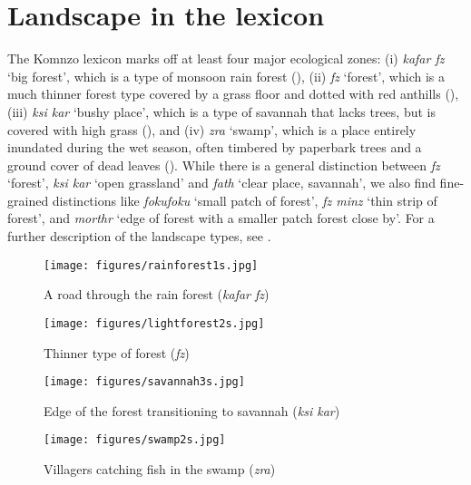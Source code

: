 \section{Landscape in the lexicon}\label{sec:landscapelex}
The Komnzo lexicon marks off at least four major ecological zones: (i) \textit{kafar fz} `big forest’, which is a type of monsoon rain forest (), (ii) \textit{fz} `forest’, which is a much thinner forest type covered by a grass floor and dotted with red anthills (), (iii) \textit{ksi kar} `bushy place’, which is a type of savannah that lacks trees, but is covered with high grass (), and (iv) \textit{zra} `swamp’, which is a place entirely inundated during the wet season, often timbered by paperbark trees and a ground cover of dead leaves (). While there is a general distinction between \textit{fz} `forest’, \textit{ksi kar} `open grassland’ and \textit{fath} `clear place, savannah’, we also find fine-grained distinctions like \textit{fokufoku} `small patch of forest’, \textit{fz minz} `thin strip of forest’, and \textit{morthr} `edge of forest with a smaller patch forest close by’. For a further description of the landscape types, see \citet[10ff.]{Dohler:2018qt}.

\begin{figure}
    \texttt{[image: figures/rainforest1s.jpg]}
    \caption{A road through the rain forest (\textit{kafar fz})}
    \label{fig:kafarfz}
\end{figure}
\begin{figure}
    \texttt{[image: figures/lightforest2s.jpg]}
    \caption{Thinner type of forest (\textit{fz})}
    \label{fig:fz}
\end{figure}
\begin{figure}
    \texttt{[image: figures/savannah3s.jpg]}
    \caption{Edge of the forest transitioning to savannah (\textit{ksi kar})}
    \label{fig:ksikar}
\end{figure}
\begin{figure}
    \texttt{[image: figures/swamp2s.jpg]}
    \caption{Villagers catching fish in the swamp (\textit{zra})}
    \label{fig:zra}
\end{figure}

